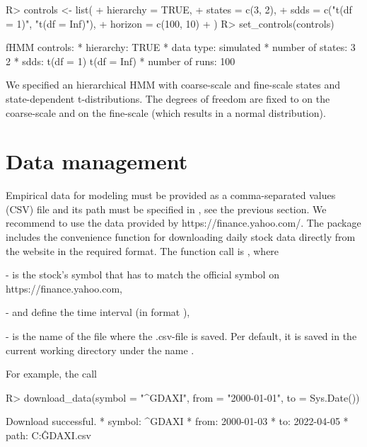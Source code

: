 \documentclass[article]{jss}
\newcommand{\fct}[1]{\code{#1()}}
\begin{document}
%
\begin{Schunk}
\begin{Sinput}
R> controls <- list(
+    hierarchy = TRUE,
+    states    = c(3, 2),
+    sdds      = c("t(df = 1)", "t(df = Inf)"),
+    horizon   = c(100, 10)
+  )
R> set_controls(controls)
\end{Sinput}
\begin{Soutput}
fHMM controls:
* hierarchy: TRUE 
* data type: simulated 
* number of states: 3 2 
* sdds: t(df = 1) t(df = Inf) 
* number of runs: 100  
\end{Soutput}
\end{Schunk}
%

We specified an hierarchical HMM with  coarse-scale and  fine-scale states  and state-dependent t-distributions. The degrees of freedom are fixed to  on the coarse-scale and  on the fine-scale (which results in a normal distribution).


\section{Data management} \label{sec:data_management} %

Empirical data for modeling must be provided as a comma-separated values (CSV) file and its path must be specified in \fct{set\_controls}, see the previous section. We recommend to use the data provided by https://finance.yahoo.com/. The  package includes the convenience function \fct{download\_data} for downloading daily stock data directly from the website in the required format. The function call is , where

-  is the stock's symbol that has to match the official symbol on https://finance.yahoo.com,

-  and  define the time interval (in format ),

-  is the name of the file where the .csv-file is saved. Per default, it is saved in the current working directory under the name .

For example, the call

%
\begin{Schunk}
\begin{Sinput}
R> download_data(symbol = "^GDAXI", from = "2000-01-01", to = Sys.Date())
\end{Sinput}
\begin{Soutput}
Download successful.
* symbol: ^GDAXI 
* from: 2000-01-03 
* to: 2022-04-05 
* path: C:\Users\Lennart\Projekte\fHMM\jss\^GDAXI.csv
\end{Soutput}
\end{Schunk}
%
\end{document}
